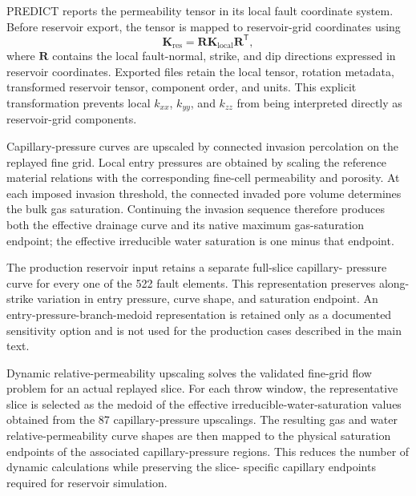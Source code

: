 PREDICT reports the permeability tensor in its local fault coordinate system.
Before reservoir export, the tensor is mapped to reservoir-grid coordinates
using
\begin{equation}
  \mathbf{K}_{\mathrm{res}} =
  \mathbf{R}\mathbf{K}_{\mathrm{local}}\mathbf{R}^{\mathsf T},
  \label{eq:si-tensor-rotation}
\end{equation}
where $\mathbf{R}$ contains the local fault-normal, strike, and dip directions
expressed in reservoir coordinates. Exported files retain the local tensor,
rotation metadata, transformed reservoir tensor, component order, and units.
This explicit transformation prevents local $k_{xx}$, $k_{yy}$, and $k_{zz}$
from being interpreted directly as reservoir-grid components.



Capillary-pressure curves are upscaled by connected invasion percolation on
the replayed fine grid. Local entry pressures are obtained by scaling the
reference material relations with the corresponding fine-cell permeability
and porosity. At each imposed invasion threshold, the connected invaded pore
volume determines the bulk gas saturation. Continuing the invasion sequence
therefore produces both the effective drainage curve and its native maximum
gas-saturation endpoint; the effective irreducible water saturation is one
minus that endpoint.

The production reservoir input retains a separate full-slice capillary-
pressure curve for every one of the 522 fault elements. This representation
preserves along-strike variation in entry pressure, curve shape, and
saturation endpoint. An entry-pressure-branch-medoid representation is
retained only as a documented sensitivity option and is not used for the
production cases described in the main text.



Dynamic relative-permeability upscaling solves the validated fine-grid flow
problem for an actual replayed slice. For each throw window, the representative
slice is selected as the medoid of the effective irreducible-water-saturation
values obtained from the 87 capillary-pressure upscalings. The resulting gas
and water relative-permeability curve shapes are then mapped to the physical
saturation endpoints of the associated capillary-pressure regions. This
reduces the number of dynamic calculations while preserving the slice-
specific capillary endpoints required for reservoir simulation.

